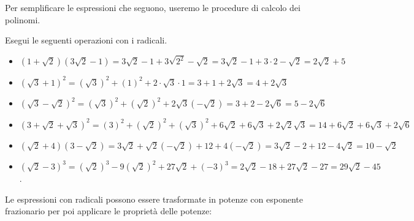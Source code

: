 Per semplificare le espressioni che seguono, useremo le procedure di calcolo 
dei polinomi.
\begin{exrig}
 \begin{esempio}
Esegui le seguenti operazioni con i radicali.
\begin{itemize}
 \item \((1+\sqrt 2)(3\sqrt 2-1)=3\sqrt 2-1+3\sqrt {2^2}-\sqrt 2=
        3\sqrt 2-1+3\cdot 2-\sqrt 2=2\sqrt 2+5\)
 \item \((\sqrt 3+1)^2=(\sqrt 3)^2+(1)^2+2\cdot \sqrt 3\cdot 1=
        3+1+2\sqrt 3=4+2\sqrt 3\)
 \item \((\sqrt 3-\sqrt 2)^2=(\sqrt 3)^2+(\sqrt 2)^2+2 \sqrt 3 (-\sqrt 2)=
        3+2-2\sqrt 6=5-2\sqrt 6\)
 \item \((3+\sqrt 2+\sqrt 3)^2=
        (3)^2+(\sqrt 2)^2+(\sqrt 3)^2+6 \sqrt 2+6 \sqrt 3+2 \sqrt 2 \sqrt 3=
        14+6\sqrt 2+6\sqrt 3+2\sqrt 6\)
 \item \((\sqrt 2+4)(3-\sqrt 2)=3\sqrt 2 +\sqrt 2(-\sqrt 2)+12+4(-\sqrt 2)=
        3\sqrt 2-2+12-4\sqrt 2=10-\sqrt 2\)
 \item \((\sqrt 2-3)^3=(\sqrt 2)^3-9(\sqrt 2)^2+27\sqrt 2+(-3)^3=
        2\sqrt 2-18+27\sqrt 2-27=29\sqrt 2-45\).
\end{itemize}
 \end{esempio}
\end{exrig}

Le espressioni con radicali possono essere trasformate in potenze con 
esponente frazionario per poi applicare le proprietà delle potenze:

